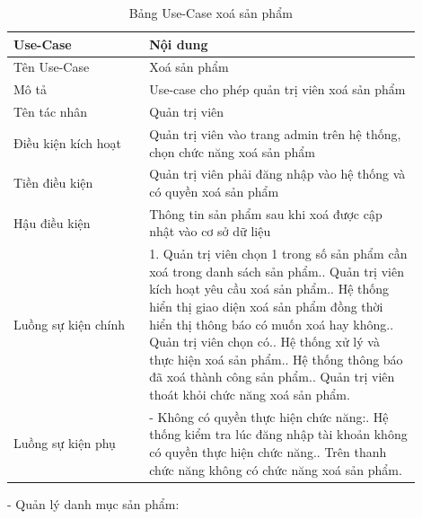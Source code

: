 \newpage
\begin{longtable}[htp]{ |m{0.3\linewidth}|m{0.6\linewidth}|}
 \caption{Bảng Use-Case xoá sản phẩm \label{long}}\\
 \hline
 Use-Case & Nội dung \\
 \hline
 Tên Use-Case & Xoá sản phẩm \\
 \hline
 Mô tả & Use-case cho phép quản trị viên xoá sản phẩm\\
 \hline
 Tên tác nhân & Quản trị viên\\
 \hline
 Điều kiện kích hoạt & Quản trị viên vào trang admin trên hệ thống, chọn chức năng xoá sản phẩm\\
 \hline
 Tiền điều kiện & Quản trị viên phải đăng nhập vào hệ thống và có quyền xoá sản phẩm\\
 \hline
 Hậu điều kiện & Thông tin sản phẩm sau khi xoá được cập nhật vào cơ sở dữ liệu\\
 \hline
 Luồng sự kiện chính & 
 1. Quản trị viên chọn 1 trong số sản phẩm cần xoá trong danh sách sản phẩm.\newline
 2. Quản trị viên kích hoạt yêu cầu xoá sản phẩm.\newline
 3. Hệ thống hiển thị giao diện xoá sản phẩm đồng thời hiển thị thông báo có muốn xoá hay không.\newline
 4. Quản trị viên chọn có.\newline
 5. Hệ thống xử lý và thực hiện xoá sản phẩm.\newline
 6. Hệ thống thông báo đã xoá thành công sản phẩm.\newline	
 7. Quản trị viên thoát khỏi chức năng xoá sản phẩm.
 \\
 \hline
 Luồng sự kiện phụ & 
  - Không có quyền thực hiện chức năng:\newline
  1. Hệ thống kiểm tra lúc đăng nhập tài khoản không có quyền thực hiện chức năng.\newline
  2. Trên thanh chức năng không có chức năng xoá sản phẩm.
 \\
 \hline
\end{longtable}
\newpage
- Quản lý danh mục sản phẩm:
